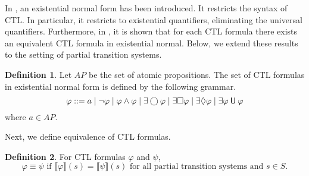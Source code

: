 \documentclass[12pt]{article}
\newcommand{\always}{\Box}
\newcommand{\eventually}{\Diamond}
\newcommand{\nxt}{\bigcirc}
\newcommand{\until}{\mathbin{\sf U}}
\theoremstyle{definition}
\newtheorem{definition}{Definition}
\newcommand{\satisfaction}[1]{\llbracket #1 \rrbracket}
\begin{document}
In \cite[Definition~6.13]{BK08}, an existential normal form has been introduced.  It restricts the syntax of CTL.  In particular, it restricts to existential quantifiers, eliminating the universal quantifiers.  Furthermore, in \cite[Theorem~6.14]{BK08}, it is shown that for each CTL formula there exists an equivalent CTL formula in existential normal.  Below, we extend these results to the setting of partial transition systems.

\begin{definition}
Let $\mathit{AP}$ be the set of atomic propositions.  The set of CTL formulas in existential normal form is defined by the following grammar.
\[
\varphi
::= a
\mid \neg \varphi
\mid \varphi \wedge \varphi
\mid \exists \nxt \varphi
\mid \exists \always \varphi
\mid \exists \eventually \varphi
\mid \exists \varphi \until \varphi
\]
where $a \in \mathit{AP}$.
\end{definition}

Next, we define equivalence of CTL formulas.

\begin{definition}
For CTL formulas $\varphi$ and $\psi$, 
\[
\varphi \equiv \psi \mbox{ if } \satisfaction{\varphi}(s) = \satisfaction{\psi}(s) \mbox{ for all partial transition systems and } s \in S.
\]
\end{definition}
\end{document}
